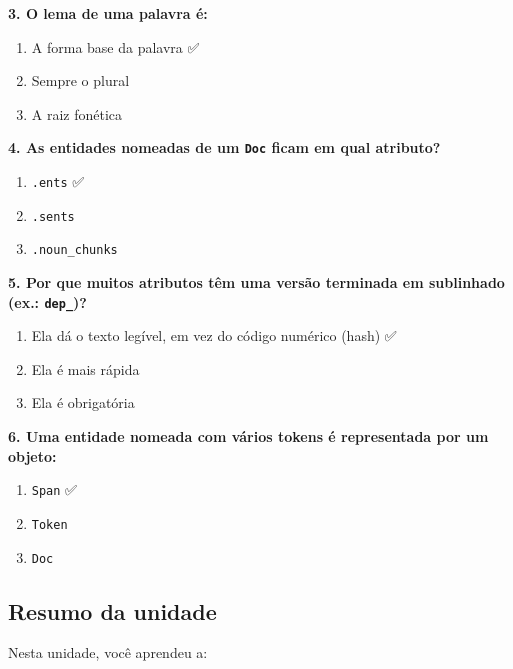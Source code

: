\documentclass[
  brazilian,
  11pt,
]{article}
\providecommand{\tightlist}{%
  \setlength{\itemsep}{0pt}\setlength{\parskip}{0pt}}
\let\oldtexttt\texttt
\renewcommand{\texttt}[1]{{\color{inlink}\oldtexttt{#1}}}
\begin{document}
\textbf{3. O lema de uma palavra é:}

\begin{enumerate}
\def\labelenumi{\arabic{enumi}.}
\tightlist
\item
  A forma base da palavra ✅
\item
  Sempre o plural
\item
  A raiz fonética
\end{enumerate}

\textbf{4. As entidades nomeadas de um \texttt{Doc} ficam em qual
atributo?}

\begin{enumerate}
\def\labelenumi{\arabic{enumi}.}
\tightlist
\item
  \texttt{.ents} ✅
\item
  \texttt{.sents}
\item
  \texttt{.noun\_chunks}
\end{enumerate}

\textbf{5. Por que muitos atributos têm uma versão terminada em
sublinhado (ex.: \texttt{dep\_})?}

\begin{enumerate}
\def\labelenumi{\arabic{enumi}.}
\tightlist
\item
  Ela dá o texto legível, em vez do código numérico (hash) ✅
\item
  Ela é mais rápida
\item
  Ela é obrigatória
\end{enumerate}

\textbf{6. Uma entidade nomeada com vários tokens é representada por um
objeto:}

\begin{enumerate}
\def\labelenumi{\arabic{enumi}.}
\tightlist
\item
  \texttt{Span} ✅
\item
  \texttt{Token}
\item
  \texttt{Doc}
\end{enumerate}

\subsection{Resumo da unidade}\label{resumo-da-unidade}

Nesta unidade, você aprendeu a:
\end{document}
